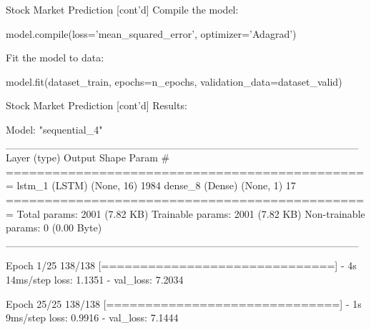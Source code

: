 \documentclass[ignorenonframetext,xcolor=x11names]{beamer}
\begin{document}
\begin{frame}[label=withcode,fragile]{Stock Market Prediction \small [cont'd]}
Compile the model:
\begin{pythoncode}
model.compile(loss='mean_squared_error', 
              optimizer='Adagrad')
\end{pythoncode}

Fit the model to data:
\begin{pythoncode}
model.fit(dataset_train, epochs=n_epochs, 
          validation_data=dataset_valid)
\end{pythoncode}
\end{frame}

\begin{frame}[label=withcode,fragile]{Stock Market Prediction \small [cont'd]}
Results:
\begin{textcode}
Model: "sequential_4"
_______________________________________________
 Layer (type)       Output Shape     Param #   
===============================================
 lstm_1 (LSTM)      (None, 16)       1984      
 dense_8 (Dense)    (None, 1)        17        
===============================================
Total params: 2001 (7.82 KB)
Trainable params: 2001 (7.82 KB)
Non-trainable params: 0 (0.00 Byte)
_______________________________________________

Epoch 1/25
138/138 [==============================] - 4s 14ms/step 
loss: 1.1351 - val_loss: 7.2034

Epoch 25/25
138/138 [==============================] - 1s 9ms/step
loss: 0.9916 - val_loss: 7.1444
\end{textcode}
\end{frame}
\end{document}
